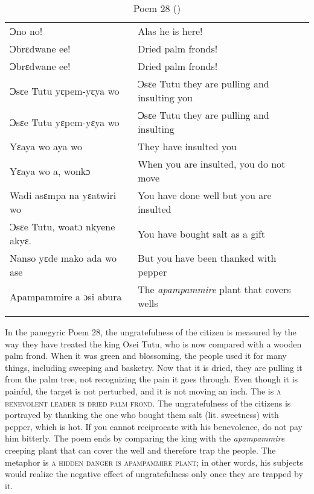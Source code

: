 \documentclass[output=paper,colorlinks,citecolor=brown]{langscibook}
\begin{document}
\begin{table}
\small
\caption{Poem 28 (\cite{Nketia1978})}
\label{tab:Poem28}
\begin{tabular}{ll}
\lsptoprule
     Ɔno no!		&		Alas he is here!\\
Ɔbrɛdwane ee!		&		Dried palm fronds!\\
Ɔbrɛdwane ee!	&			Dried palm fronds!\\
Ɔsɛe Tutu yɛpem-yɛya wo	&	Ɔsɛe Tutu they are pulling and insulting you\\ 
Ɔsɛe Tutu yɛpem-yɛya wo	&	Ɔsɛe Tutu they are pulling and insulting\\
Yɛaya wo aya wo		&	They have insulted you\\
Yɛaya wo a, wonkɔ	&		When you are insulted, you do not move\\
Wadi asɛmpa na yɛatwiri wo	&	You have done well but you are insulted\\
Ɔsɛe Tutu, woatɔ nkyene akyɛ.&	You have bought salt as a gift\\
Nanso yɛde mako ada wo ase	&	But you have been thanked with pepper\\
Apampammire a ɔsi abura	&	The \textit{apampammire} plant that covers wells\\
\lspbottomrule
\end{tabular}
\end{table}

In the panegyric Poem 28, the ungratefulness of the citizen is measured by the way they have treated the king Osei Tutu, who is now compared with a wooden palm frond. When it was green and blossoming, the people used it for many things, including sweeping and basketry. Now that it is dried, they are pulling it from the palm tree, not recognizing the pain it goes through. Even though it is painful, the target is not perturbed, and it is not moving an inch. The  is \textsc{a benevolent leader is dried palm frond}. The ungratefulness of the citizens is portrayed by thanking the one who bought them salt (lit. sweetness) with pepper, which is hot. If you cannot reciprocate with his benevolence, do not pay him bitterly. The poem ends by comparing the king with the \textit{apampammire} creeping plant that can cover the well and therefore trap the people. The metaphor is \textsc{a hidden danger is apampammire plant}; in other words, his subjects would realize the negative effect of ungratefulness only once they are trapped by it.\largerpage
\end{document}
